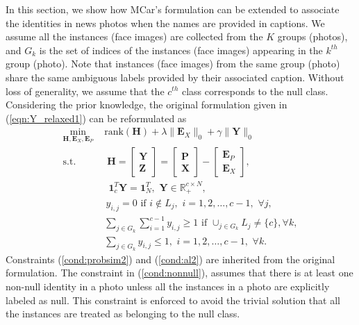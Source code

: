 \documentclass[10pt,journal,compsoc]{IEEEtran}
\begin{document}
In this section, we show how MCar's formulation can be extended to associate the identities in news photos when the names are provided in captions. We assume all the instances (face images) are collected from the $K$ groups (photos), and $G_k$ is the set of indices of the instances (face images) appearing in the $k^{th}$ group (photo). Note that instances (face images) from the same group (photo) share the same ambiguous labels provided by their associated caption. Without loss of generality, we assume that the $c^{th}$ class corresponds to the null class. Considering the prior knowledge, the original formulation given in (\ref{eqn:Y_relaxed1}) can be reformulated as
\begin{align}
 \min_{\mathbf{H}, \mathbf{E}_X, \mathbf{E}_P} \,\, & \mathrm{rank} (\mathbf{H}) + \lambda \|\mathbf{E}_X\|_0  +  \gamma \|\mathbf{Y}\|_0  \label{eqn:HardExt} \\
 \text{s.t.} & \;
{\mathbf{H}}= \begin{bmatrix}
\mathbf{Y} \\
\mathbf{Z}
\end{bmatrix}= \begin{bmatrix}
\mathbf{P} \\
\mathbf{X}
\end{bmatrix} - \begin{bmatrix}
\mathbf{E}_P \\
\mathbf{E}_X
\end{bmatrix}, \nonumber\\
&\,\; \mathbf{1}^T_c \mathbf{Y} = \mathbf{1}^T_N, \,\, \mathbf{Y} \in \mathbb{R}_+^{c \times N}, \label{cond:probsim2}\\
&\, y_{i,j} = 0 \,\, \mathrm{if}  \,\, i \notin L_j, \,\, i = 1, 2,  \dots, c-1, \,\, \forall j, \label{cond:al2}\\
&\sum_{j \in G_k}  \sum_{i=1}^{c-1} y_{i,j}  \geq 1 \,\, \mathrm{if} \,\,  \mathop{\cup}_{j \in G_k} L_j \neq \{c\}, \forall k, \label{cond:nonnull} \\
& \sum_{j \in G_k} y_{i,j}  \leq 1, \,\, i = 1, 2, \dots, c-1, \,\,  \forall k. \label{cond:unique1}
\end{align}
Constraints (\ref{cond:probsim2}) and (\ref{cond:al2}) are inherited from the original formulation. The constraint in (\ref{cond:nonnull}), assumes that there is at least one non-null identity in a photo unless all the instances in a photo are explicitly labeled as null. This constraint is enforced to avoid the trivial solution that all the instances are treated as belonging to the null class.
\end{document}
